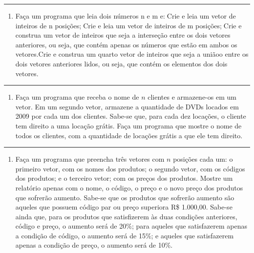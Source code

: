 \documentclass[12pt,a4paper]{article}
\providecommand{\tightlist}{%
      \setlength{\itemsep}{0pt}\setlength{\parskip}{0pt}}
\begin{document}
    \begin{center}\rule{0.5\linewidth}{0.5pt}\end{center}

\begin{enumerate}
\def\labelenumi{\arabic{enumi}.}
\setcounter{enumi}{30}
\tightlist
\item
  Faça um programa que leia dois números n e m e:Crie e leia um vetor
  de inteiros de n posições;Crie e leia um vetor de inteiros de m
  posições;Crie e construa um vetor de inteiros que seja a interseção
  entre os dois vetores anteriores, ou seja, que contém apenas os
  números que estão em ambos os vetores.Crie e construa um quarto vetor
  de inteiros que seja a uniãoo entre os dois vetores anteriores lidos,
  ou seja, que contém os elementos dos dois vetores.
\end{enumerate}

    \begin{center}\rule{0.5\linewidth}{0.5pt}\end{center}

\begin{enumerate}
\def\labelenumi{\arabic{enumi}.}
\setcounter{enumi}{31}
\tightlist
\item
  Faça um programa que receba o nome de \(n\) clientes e armazene-os em
  um vetor. Em um segundo vetor, armazene a quantidade de DVDs locados
  em 2009 por cada um dos clientes. Sabe-se que, para cada dez locações,
  o cliente tem direito a uma locação grátis. Faça um programa que
  mostre o nome de todos os clientes, com a quantidade de locações
  grátis a que ele tem direito.
\end{enumerate}

    \begin{center}\rule{0.5\linewidth}{0.5pt}\end{center}

\begin{enumerate}
\def\labelenumi{\arabic{enumi}.}
\setcounter{enumi}{32}
\tightlist
\item
  Faça um programa que preencha três vetores com \(n\) posições cada um:
  o primeiro vetor, com os nomes dos produtos; o segundo vetor, com os
  códigos dos produtos; e o terceiro vetor; com os preços dos produtos.
  Mostre um relatório apenas com o nome, o código, o preço e o novo
  preço dos produtos que sofrerão aumento. Sabe-se que os produtos que
  sofrerão aumento são aqueles que possuem código par ou preço superiora
  R\$ 1.000,00. Sabe-se ainda que, para os produtos que satisfizerem às
  duas condições anteriores, código e preço, o aumento será de 20\%;
  para aqueles que satisfazerem apenas a condição de código, o aumento
  será de 15\%; e aqueles que satisfazerem apenas a condição de preço, o
  aumento será de 10\%.
\end{enumerate}
\end{document}
